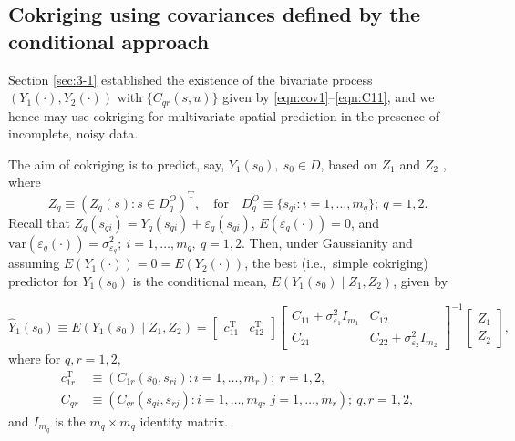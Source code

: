 \documentclass[lineno]{biometrika}
\def\T{{ \mathrm{\scriptscriptstyle T} }}
\newcommand{\Cmat} {C}
\newcommand{\cmat} {c}
\newcommand{\Imat} {I}
\newcommand{\svec} {s}
\newcommand{\s}{s}
\renewcommand{\u}{u}
\newcommand{\Zvec}{Z}
\newcommand{\E}{E}
\newcommand{\var}{\mathrm{var}}
\begin{document}
\subsection{Cokriging using covariances defined by the conditional approach}\label{sec:3-2}

Section \ref{sec:3-1} established the existence of the bivariate process $(Y_1(\cdot),Y_2(\cdot))$ with $\{C_{qr}(\s,\u)\}$ given by \eqref{eqn:cov1}--\eqref{eqn:C11}, and we hence may use cokriging for multivariate spatial prediction in the presence of incomplete, noisy data.

The aim of cokriging is to predict, say, $Y_1(\svec_0),~\svec_0 \in D$, based on $\Zvec_1$ and $\Zvec_2$ \citep[][p.~138]{Cressie1993}, where
\begin{equation}\label{eq:DO}
\Zvec_q \equiv (Z_q(\svec):\svec \in D_q^O)^\T,\quad \textrm{for} \quad D_q^O \equiv \{\svec_{qi}: i=1,\dots,m_q\};~ q=1,2.
\end{equation}
Recall that $Z_q(\svec_{qi}) = Y_q(\svec_{qi}) + \varepsilon_q(\svec_{qi})$, $\E(\varepsilon_q(\cdot)) = 0$, and $\var(\varepsilon_q(\cdot)) = \sigma^2_{\varepsilon_q};~i = 1,\dots,m_q,~q=1,2$. Then, under Gaussianity and assuming $\E(Y_1(\cdot)) = 0 = \E(Y_2(\cdot))$, the best (i.e.,~simple cokriging) predictor for $Y_1(\svec_0)$ is the conditional mean, $\E(Y_1(\svec_0) \mid  \Zvec_1, \Zvec_2)$, given by

\begin{equation}\label{eq:cokrig}
\hat Y_1(\svec_0) \equiv \E(Y_1(\svec_0) \mid  \Zvec_1, \Zvec_2) = \begin{bmatrix} \cmat_{11}^\T & \cmat_{12}^\T \end{bmatrix} 
										\begin{bmatrix} \Cmat_{11} + \sigma^2_{\varepsilon_1} \Imat_{m_1} & \Cmat_{12} \\ \Cmat_{21} & \Cmat_{22} + \sigma^2_{\varepsilon_2} \Imat_{m_2} \end{bmatrix}^{-1}
										\begin{bmatrix} \Zvec_1 \\ \Zvec_2 \end{bmatrix},
\end{equation}
\noindent where for $q,r = 1,2$,
\begin{align*}
\cmat_{1r}^\T& \equiv (C_{1r}(\svec_0,\svec_{ri}) : i = 1,\dots,m_r );~r = 1,2, \\
\Cmat_{qr} & \equiv (C_{qr}(\svec_{qi},\svec_{rj}) : i = 1,\dots,m_q,\, j = 1,\dots,m_{r} );~q,r = 1,2,
\end{align*}
\noindent and $\Imat_{m_q}$ is the $m_q \times m_q$ identity matrix.
\end{document}
